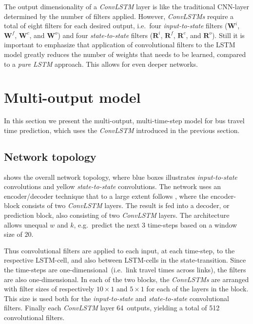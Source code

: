\documentclass[preprint,11pt,5p,twocolumn]{elsarticle}
\newcommand{\matr}[1]{\mathbf{#1}}
\begin{document}
The output dimensionality of a \emph{ConvLSTM} layer is like the traditional CNN-layer determined by the number of filters applied. However, \emph{ConvLSTMs} require a total of eight filters for each desired output, i.e.\ four \emph{input-to-state} filters ($\matr{W}^i$, $\matr{W}^f$, $\matr{W}^c$, and $\matr{W}^o$) and four \emph{state-to-state} filters ($\matr{R}^i$, $\matr{R}^f$, $\matr{R}^c$, and $\matr{R}^o$).
Still it is important to emphasize that application of convolutional filters to the LSTM model greatly reduces the number of weights that needs to be learned, compared to a \emph{pure LSTM} approach. This allows for even deeper networks.
\newpage

\section{Multi-output model}
\label{sec:model}
In this section we present the multi-output, multi-time-step model for bus travel time prediction, which uses the \emph{ConvLSTM} introduced in the previous section.

\subsection{Network topology}


 shows the overall network topology, where blue boxes illustrates \emph{input-to-state} convolutions and yellow \emph{state-to-state} convolutions. The network uses an encoder/decoder technique that to a large extent follows \cite{ConvLSTM}, where the encoder-block consists of two \emph{ConvLSTM} layers. The result is fed into a decoder, or prediction block, also consisting of two \emph{ConvLSTM} layers. The architecture allows unequal $w$ and $k$, e.g.\ predict the next $3$ time-steps based on a window size of $20$.

Thus convolutional filters are applied to each input, at each time-step, to the respective LSTM-cell, and also between LSTM-cells in the state-transition. Since the time-steps are one-dimensional~(i.e.\ link travel times across links), the filters are also one-dimensional. In each of the two blocks, the \emph{ConvLSTMs} are arranged with filter sizes of respectively $10\times1$ and $5\times1$ for each of the layers in the block. This size is used both for the \emph{input-to-state} and \emph{state-to-state} convolutional filters. Finally each \emph{ConvLSTM} layer 64~outputs, yielding a total of 512 convolutional filters.
\end{document}

